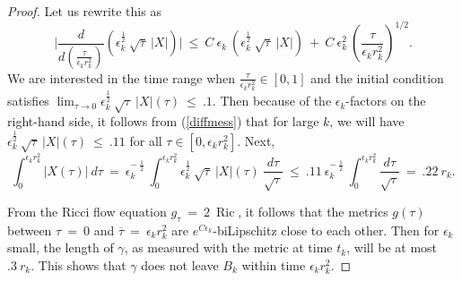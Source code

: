 \documentclass[12pt]{amsart}
\newcommand{\Ric}{\operatorname{Ric}}
\numberwithin{equation}{section}
\theoremstyle{plain}
\theoremstyle{definition}
\theoremstyle{remark}
\begin{document}
\begin{proof}
Let us rewrite this as
\begin{equation} \label{diffmess}
\Big| \frac{d}{d( \frac{\tau}{\epsilon_k r_k^2})} \left( 
\epsilon_k^{\frac12} \: \sqrt{\tau} \: 
|X| \right) \Big| \: \le \:
C \: \epsilon_k \: \left( \epsilon_k^{\frac12} \: \sqrt{\tau} \: |X| \right)
\: + \: C \: \epsilon_k^2 \: \left(
\frac{\tau}{\epsilon_k r_k^2} \right)^{1/2}.
\end{equation}
We are interested in the time range when $\frac{\tau}{\epsilon_k r_k^2}
\in [0,1]$ and the initial condition satisfies
$\lim_{\tau \rightarrow 0} \epsilon_k^{\frac12} \: \sqrt{\tau} \: 
|X|(\tau) \: \le \: .1$. Then because of the $\epsilon_k$-factors
on the right-hand side, it follows from (\ref{diffmess})
that for large $k$, we will have $\epsilon_k^{\frac12} \: \sqrt{\tau} \: 
|X|(\tau) \: \le \: .11$ for all $\tau \in [0, \epsilon_k r_k^2]$.
Next,
\begin{equation}
\int_0^{\epsilon_k r_k^2} |X(\tau)| \: d\tau \: = \:
\epsilon_k^{- \: \frac12} \: \int_0^{\epsilon_k r_k^2} 
\epsilon_k^{\frac12} \: \sqrt{\tau} \: 
|X|(\tau) \: \frac{d\tau}{\sqrt{\tau}} \: \le \:
.11 \:
\epsilon_k^{- \: \frac12} \: \int_0^{\epsilon_k r_k^2} 
\frac{d\tau}{\sqrt{\tau}} \: = \: .22 \: r_k.
\end{equation}

From the Ricci flow equation $g_\tau \: = \: 2 \: \Ric$, it follows 
that the metrics $g(\tau)$ between $\tau \: = \: 0$ and 
$\overline{\tau} \: = \: \epsilon_k r_k^2$
are $e^{C \epsilon_k}$-biLipschitz close to each other.  Then for
$\epsilon_k$ small,  the length
of $\gamma$, as measured with the metric at time $t_k$, will be at most
$.3 \: r_k$. This shows that $\gamma$ does not leave $B_k$ within
time $\epsilon_k r_k^2$.


\end{proof}
\end{document}
